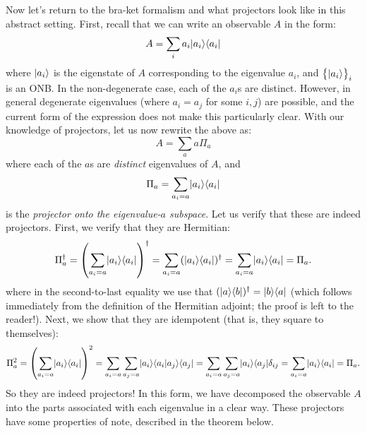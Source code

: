 Now let's return to the bra-ket formalism and what projectors look like in this abstract setting. First, recall that we can write an observable $A$ in the form:
\begin{equation}
    A = \sum_i a_i \lvert a_i \rangle \langle a_i \rvert
\end{equation}
where $\lvert a_i \rangle$ is the eigenstate of $A$ corresponding to the eigenvalue $a_i$, and $\set{\lvert a_i \rangle}_i$ is an ONB. In the non-degenerate case, each of the $a_i$s are distinct. However, in general degenerate eigenvalues (where $a_i = a_j$ for some $i, j$) are possible, and the current form of the expression does not make this particularly clear. With our knowledge of projectors, let us now rewrite the above as:
\begin{equation}
    A = \sum_a a \Pi_a
\end{equation}
where each of the $a$s are \emph{distinct} eigenvalues of $A$, and
\begin{equation}
    \Pi_a = \sum_{a_i = a} \lvert a_i \rangle \langle a_i \rvert
\end{equation}
is the \emph{projector onto the eigenvalue-$a$ subspace}. Let us verify that these are indeed projectors. First, we verify that they are Hermitian:
\begin{equation}
    \Pi_a^\dagger = \left(\sum_{a_i = a} \lvert a_i \rangle \langle a_i \rvert\right)^\dagger = \sum_{a_i = a} (\lvert a_i \rangle \langle a_i \rvert)^\dagger = \sum_{a_i = a} \lvert a_i \rangle \langle a_i \rvert = \Pi_a.
\end{equation}
where in the second-to-last equality we use that $(\lvert a \rangle \langle b \rvert)^\dagger = \lvert b \rangle \langle a \rvert$ (which follows immediately from the definition of the Hermitian adjoint; the proof is left to the reader!). Next, we show that they are idempotent (that is, they square to themselves):
\begin{equation}\label{eq-projectoridempotency}
    \Pi_a^2 = \left(\sum_{a_i = a} \lvert a_i \rangle \langle a_i \rvert\right)^2 = \sum_{a_i = a} \sum_{a_j = a} \lvert a_i \rangle\langle a_i \lvert a_j \rangle\langle a_j \rvert = \sum_{a_i = a}\sum_{a_j = a}\lvert a_i \rangle \langle a_j \rvert\delta_{ij} = \sum_{a_i = a} \lvert a_i \rangle \langle a_i \rvert = \Pi_a.
\end{equation}
So they are indeed projectors! In this form, we have decomposed the observable $A$ into the parts associated with each eigenvalue in a clear way. These projectors have some properties of note, described in the theorem below.

